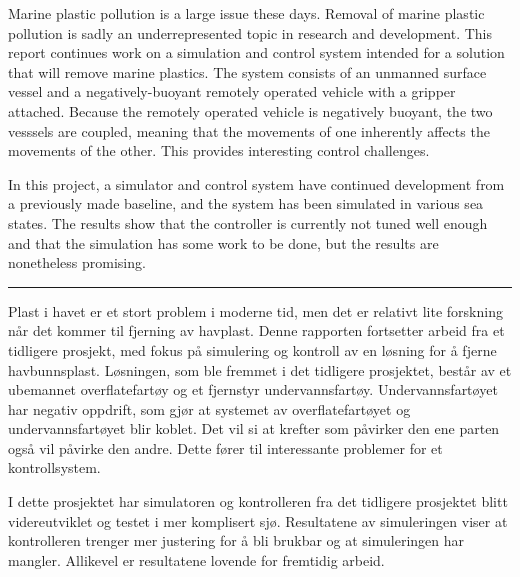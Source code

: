 \documentclass[class=article, crop=false]{standalone}
\begin{document}
Marine plastic pollution is a large issue these days. Removal of marine plastic pollution is sadly an underrepresented topic in research and development. This report continues work on a simulation and control system intended for a solution that will remove marine plastics. The system consists of an unmanned surface vessel and a negatively-buoyant remotely operated vehicle with a gripper attached. Because the remotely operated vehicle is negatively buoyant, the two vesssels are coupled, meaning that the movements of one inherently affects the movements of the other. This provides interesting control challenges.

In this project, a simulator and control system have continued development from a previously made baseline, and the system has been simulated in various sea states. The results show that the controller is currently not tuned well enough and that the simulation has some work to be done, but the results are nonetheless promising.

\vspace{20pt}

\hrule

\vspace{20pt}

Plast i havet er et stort problem i moderne tid, men det er relativt lite forskning når det kommer til fjerning av havplast. Denne rapporten fortsetter arbeid fra et tidligere prosjekt, med fokus på simulering og kontroll av en løsning for å fjerne havbunnsplast. Løsningen, som ble fremmet i det tidligere prosjektet, består av et ubemannet overflatefartøy og et fjernstyr undervannsfartøy. Undervannsfartøyet har negativ oppdrift, som gjør at systemet av overflatefartøyet og undervannsfartøyet blir koblet. Det vil si at krefter som påvirker den ene parten også vil påvirke den andre. Dette fører til interessante problemer for et kontrollsystem.

I dette prosjektet har simulatoren og kontrolleren fra det tidligere prosjektet blitt videreutviklet og testet i mer komplisert sjø. Resultatene av simuleringen viser at kontrolleren trenger mer justering for å bli brukbar og at simuleringen har mangler. Allikevel er resultatene lovende for fremtidig arbeid.


\end{document}

